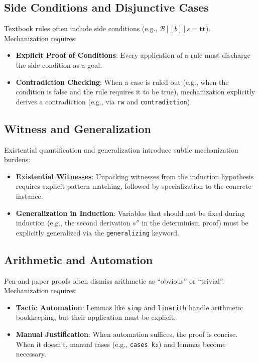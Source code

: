 \subsection*{Side Conditions and Disjunctive Cases}

Textbook rules often include side conditions
(e.g., $\mathcal{B}[\![b]\!]s = \mathbf{tt}$).
Mechanization requires:

\begin{itemize}
    \item \textbf{Explicit Proof of Conditions}:
    Every application of a rule must discharge the side condition as a goal.
    
    \item \textbf{Contradiction Checking}:
    When a case is ruled out (e.g., when the condition is false and the rule
    requires it to be true), mechanization explicitly derives a
    contradiction (e.g., via \texttt{rw} and \texttt{contradiction}).
\end{itemize}

\subsection*{Witness and Generalization}

Existential quantification and generalization introduce subtle mechanization
burdens:

\begin{itemize}
    \item \textbf{Existential Witnesses}:
    Unpacking witnesses from the induction hypothesis requires explicit
    pattern matching, followed by specialization to the concrete instance.
    
    \item \textbf{Generalization in Induction}:
    Variables that should not be fixed during induction
    (e.g., the second derivation $s''$ in the determinism proof)
    must be explicitly generalized via the \texttt{generalizing} keyword.
\end{itemize}

\subsection*{Arithmetic and Automation}

Pen-and-paper proofs often dismiss arithmetic as ``obvious'' or ``trivial''.
Mechanization requires:

\begin{itemize}
    \item \textbf{Tactic Automation}:
    Lemmas like \texttt{simp} and \texttt{linarith} handle arithmetic
    bookkeeping, but their application must be explicit.
    
    \item \textbf{Manual Justification}:
    When automation suffices, the proof is concise. When it doesn't,
    manual cases (e.g., \texttt{cases k₂}) and lemmas become necessary.
\end{itemize}

